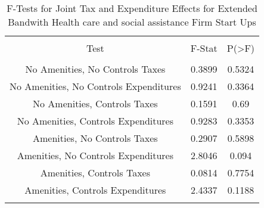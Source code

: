 
\begin{table}[!htbp] \centering 
  \caption{F-Tests for Joint Tax and Expenditure Effects for Extended Bandwith Health care and social assistance Firm Start Ups} 
  \label{62Ftests} 
\begin{tabular}{@{\extracolsep{5pt}} ccc} 
\\[-1.8ex]\hline 
\hline \\[-1.8ex] 
Test & F-Stat & P(\textgreater F) \\ 
\hline \\[-1.8ex] 
No Amenities, No Controls Taxes & 0.3899 & 0.5324 \\ 
No Amenities, No Controls Expenditures & 0.9241 & 0.3364 \\ 
No Amenities, Controls Taxes & 0.1591 & 0.69 \\ 
No Amenities, Controls Expenditures & 0.9283 & 0.3353 \\ 
Amenities, No Controls Taxes & 0.2907 & 0.5898 \\ 
Amenities, No Controls Expenditures & 2.8046 & 0.094 \\ 
Amenities, Controls Taxes & 0.0814 & 0.7754 \\ 
Amenities, Controls Expenditures & 2.4337 & 0.1188 \\ 
\hline \\[-1.8ex] 
\end{tabular} 
\end{table} 
